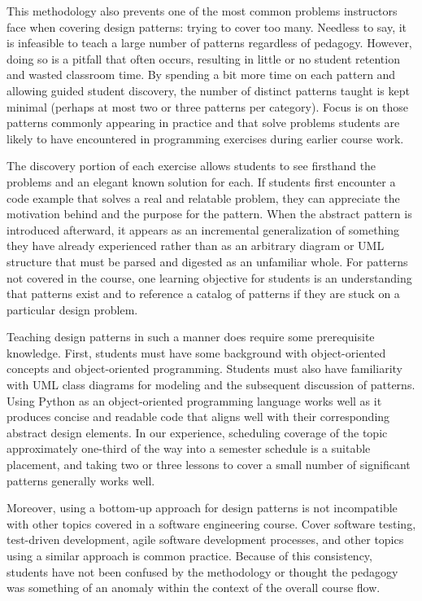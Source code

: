 \documentclass[conference]{IEEEtran}
\begin{document}
This methodology also prevents one of the most common problems instructors face when covering design patterns: trying to cover too many. Needless to say, it is infeasible to teach a large number of patterns regardless of pedagogy. However, doing so is a pitfall that often occurs, resulting in little or no student retention and wasted classroom time. By spending a bit more time on each pattern and allowing guided student discovery, the number of distinct patterns taught is kept minimal (perhaps at most two or three patterns per category). Focus is on those patterns commonly appearing in practice and that solve problems students are likely to have encountered in programming exercises during earlier course work.

The discovery portion of each exercise allows students to see firsthand the problems and an elegant known solution for each. If students first encounter a code example that solves a real and relatable problem, they can appreciate the motivation behind and the purpose for the pattern. When the abstract pattern is introduced afterward, it appears as an incremental generalization of something they have already experienced rather than as an arbitrary diagram or UML structure that must be parsed and digested as an unfamiliar whole. For patterns not covered in the course, one learning objective for students is an understanding that patterns exist and to reference a catalog of patterns if they are stuck on a particular design problem.

Teaching design patterns in such a manner does require some prerequisite knowledge. First, students must have some background with object-oriented concepts and object-oriented programming. Students must also have familiarity with UML class diagrams for modeling and the subsequent discussion of patterns.  Using Python as an object-oriented programming language works well as it produces concise and readable code that aligns well with their corresponding abstract design elements. In our experience, scheduling coverage of the topic approximately one-third of the way into a semester schedule is a suitable placement, and taking two or three lessons to cover a small number of significant patterns generally works well.

Moreover, using a bottom-up approach for design patterns is not incompatible with other topics covered in a software engineering course. Cover software testing, test-driven development, agile software development processes, and other topics using a similar approach is common practice. Because of this consistency, students have not been confused by the methodology or thought the pedagogy was something of an anomaly within the context of the overall course flow.
\end{document}
